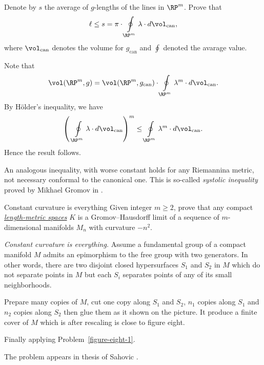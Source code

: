 Denote by $s$ the average of $g$-lengths of the lines in $\RP^m$.
Prove that 
\[\ell \le s=\pi\cdot\oint\limits_{\RP^m}\lambda\cdot d\vol_{\mathrm{can}},\]
where $\vol_{\mathrm{can}}$ denotes the volume for $g_{\mathrm{can}}$ and $\oint$ denoted the avarage value.

Note that
\[\vol(\RP^m,g)
=
\vol(\RP^m,g_{\mathrm{can}})
\cdot
\oint\limits_{\RP^m}\lambda^m\cdot d\vol_{\mathrm{can}}.\]
By Hölder's inequality, we have
\[\left(\,\,\oint\limits_{\RP^m}\lambda\cdot d\vol_{\mathrm{can}}\right)^m
\le \oint\limits_{\RP^m}\lambda^m\cdot d\vol_{\mathrm{can}}.\]
Hence the result follows.

An analogous inequality,
with worse constant holds for any Riemannina metric, 
not necessary conformal to the canonical one.
This is so-called \emph{systolic inequality} proved by Mikhael Gromov in \cite{gromov-filling}.



















\begin{pr}{\thm}{Constant curvature is everything}\label{figure-eight-2} Given integer $m\ge 2$, prove that any compact \hyperref[Length-metric space]{\emph{length-metric spaces}} $K$ is a Gromov--Hausdorff limit of a sequence of $m$-dimensional
manifolds $M_n$ with curvature $-n^2$.
\end{pr}

\textit{Constant curvature is everything.}
Assume a fundamental group of a compact manifold $M$ admits an epimorphism to the free group with two generators.
In other words, there are two disjoint closed hypersurfaces $S_1$ and $S_2$ in $M$ 
which do not separate points in $M$
but each $S_i$ separates points of any of its small neighborhoods.

Prepare many copies of $M$, cut one copy along $S_1$ and $S_2$,
$n_1$ copies along $S_1$ and $n_2$ copies along $S_2$
then glue them as it shown on the picture. 
It produce a finite cover of $M$ which is after rescaling is close to figure eight.

Finally applying Problem~\ref{figure-eight-1}.

 The problem appears in thesis of Sahovic \cite{sahovic}.



















